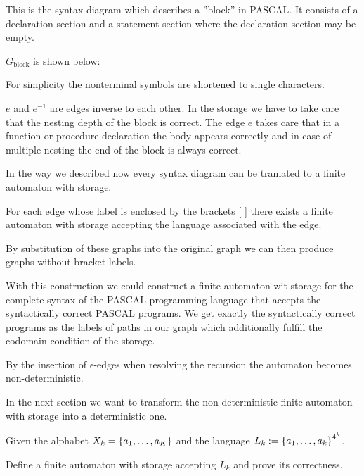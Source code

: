 \missingfigure

This is the syntax diagram which describes a ''block'' in PASCAL. It consists of
a declaration section and a statement section where the declaration section may
be empty.

$G_{\text{block}}$ is shown below:

\missingfigure

For simplicity the nonterminal symbols are shortened to single characters.

$e$ and $e^{-1}$ are edges inverse to each other. In the storage we have to
take care that the nesting depth of the block is correct. The edge $e$ takes
care that in a function or procedure-declaration the body appears correctly and
in case of multiple nesting the end of the block is always correct.

In the way we described now every syntax diagram can be tranlated to a finite
automaton with storage.

For each edge whose label is enclosed by the brackets [ ] there exists a finite
automaton with storage accepting the language associated with the edge.

By substitution of these graphs into the original graph we can then produce
graphs without bracket labels.

With this construction we could construct a finite automaton wit storage for the
complete syntax of the PASCAL programming language that accepts the
syntactically correct PASCAL programs. We get exactly the syntactically correct
programs as the labels of paths in our graph which additionally fulfill the
codomain-condition of the storage.

By the insertion of $\epsilon$-edges when resolving the recursion the automaton
becomes non-deterministic.

In the next section we want to transform the non-deterministic finite automaton
with storage into a deterministic one.

\bigskip
\begin{exercise}
Given the alphabet $X_k = \mbox{$\{a_1, \ldots, a_K\}$}$ and the language $L_k :=
\mbox{$\{a_1, \ldots, a_k\}$}^{4^k}$.

Define a finite automaton with storage accepting $L_k$ and prove its
correctness.
\end{exercise}

